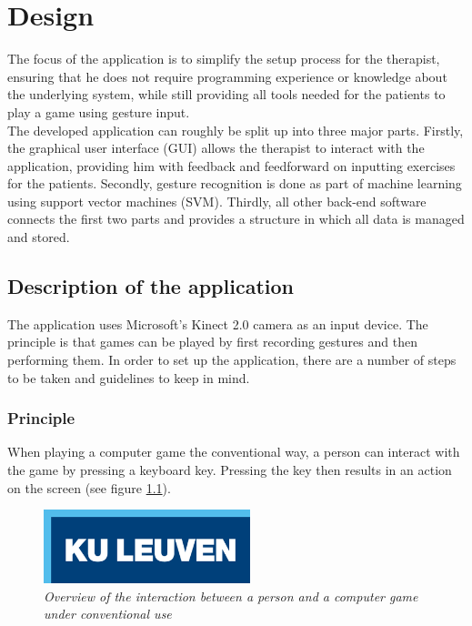 \chapter{Design}

The focus of the application is to simplify the setup process for the therapist, ensuring that he does not require programming experience or knowledge about the underlying system, while still providing all tools needed for the patients to play a game using gesture input.\\

The developed application can roughly be split up into three major parts. Firstly, the graphical user interface (GUI) allows the therapist to interact with the application, providing him with feedback and feedforward on inputting exercises for the patients. Secondly, gesture recognition is done as part of machine learning using support vector machines (SVM). Thirdly, all other back-end software connects the first two parts and provides a structure in which all data is managed and stored.


\section{Description of the application}

The application uses Microsoft's Kinect 2.0 camera as an input device. The principle is that games can be played by first recording gestures and then performing them. In order to set up the application, there are a number of steps to be taken and guidelines to keep in mind.


\subsection{Principle}

When playing a computer game the conventional way, a person can interact with the game by pressing a keyboard key. Pressing the key then results in an action on the screen (see figure \ref{fig: overview_basic_interaction}).\\

\begin{figure}[H]
\begin{center}
\includegraphics[width=6cm]{KUL.png} %
\caption{\emph{Overview of the interaction between a person and a computer game under conventional use}}
\label{fig: overview_basic_interaction}
\end{center}
\end{figure}

